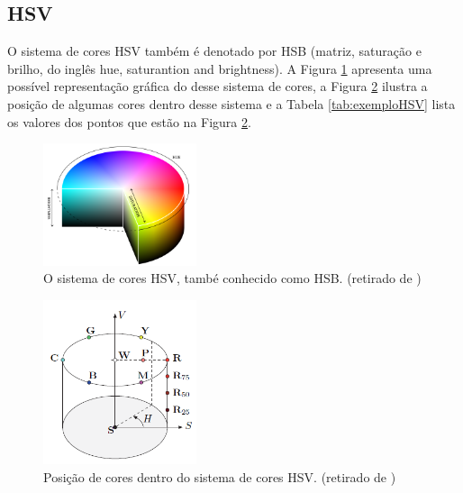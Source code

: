\documentclass[	12pt, Times, openright, twoside, a4paper, english, brazil]{abntex2}
\begin{document}
\subsection{HSV}

O sistema de cores HSV também é denotado por HSB (matriz, saturação e brilho, do inglês hue, saturantion and brightness)\cite{burger2009digital}. A Figura \ref{fig:figuraHSV} apresenta uma possível representação gráfica do desse sistema de cores, a Figura \ref{fig:figuraHSV2} ilustra a posição de algumas cores dentro desse sistema e a Tabela \ref{tab:exemploHSV} lista os valores dos pontos que estão na Figura \ref{fig:figuraHSV2}.

\begin{figure}[!htb]
\centering \includegraphics[width=0.4\textwidth]{figuraHSV.png}
\caption{O sistema de cores HSV, també conhecido como HSB. (retirado de ) \label{fig:figuraHSV}}
\end{figure}

\begin{figure}[!htb]
\centering \includegraphics[width=0.4\textwidth]{figuraHSV2.png}
\caption{Posição de cores dentro do sistema de cores HSV. (retirado de ) \label{fig:figuraHSV2}}
\end{figure}
\end{document}
